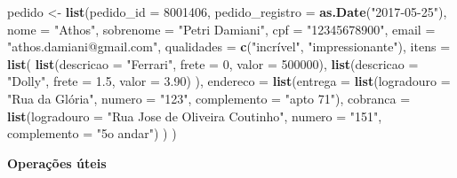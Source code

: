 \documentclass[
]{book}
\newenvironment{Shaded}{\begin{snugshade}}{\end{snugshade}}
\newcommand{\CommentTok}[1]{\textcolor[rgb]{0.56,0.35,0.01}{\textit{#1}}}
\newcommand{\DataTypeTok}[1]{\textcolor[rgb]{0.13,0.29,0.53}{#1}}
\newcommand{\DecValTok}[1]{\textcolor[rgb]{0.00,0.00,0.81}{#1}}
\newcommand{\FloatTok}[1]{\textcolor[rgb]{0.00,0.00,0.81}{#1}}
\newcommand{\KeywordTok}[1]{\textcolor[rgb]{0.13,0.29,0.53}{\textbf{#1}}}
\newcommand{\NormalTok}[1]{#1}
\newcommand{\OperatorTok}[1]{\textcolor[rgb]{0.81,0.36,0.00}{\textbf{#1}}}
\newcommand{\StringTok}[1]{\textcolor[rgb]{0.31,0.60,0.02}{#1}}
\begin{document}
\begin{Shaded}
\begin{Highlighting}[]
\NormalTok{pedido <{-}}\StringTok{ }\KeywordTok{list}\NormalTok{(}\DataTypeTok{pedido\_id =} \DecValTok{8001406}\NormalTok{,}
               \DataTypeTok{pedido\_registro =} \KeywordTok{as.Date}\NormalTok{(}\StringTok{"2017{-}05{-}25"}\NormalTok{),}
               \DataTypeTok{nome =} \StringTok{"Athos"}\NormalTok{, }
               \DataTypeTok{sobrenome =} \StringTok{"Petri Damiani"}\NormalTok{, }
               \DataTypeTok{cpf =} \StringTok{"12345678900"}\NormalTok{, }
               \DataTypeTok{email =} \StringTok{"athos.damiani@gmail.com"}\NormalTok{, }
               \DataTypeTok{qualidades =} \KeywordTok{c}\NormalTok{(}\StringTok{"incrível"}\NormalTok{, }\StringTok{"impressionante"}\NormalTok{),}
               \DataTypeTok{itens =} \KeywordTok{list}\NormalTok{(}
                 \KeywordTok{list}\NormalTok{(}\DataTypeTok{descricao =} \StringTok{"Ferrari"}\NormalTok{, }
                      \DataTypeTok{frete =} \DecValTok{0}\NormalTok{, }
                      \DataTypeTok{valor =} \DecValTok{500000}\NormalTok{),}
                 \KeywordTok{list}\NormalTok{(}\DataTypeTok{descricao =} \StringTok{"Dolly"}\NormalTok{, }
                      \DataTypeTok{frete =} \FloatTok{1.5}\NormalTok{, }
                      \DataTypeTok{valor =} \FloatTok{3.90}\NormalTok{)}
\NormalTok{               ), }
               \DataTypeTok{endereco =} \KeywordTok{list}\NormalTok{(}\DataTypeTok{entrega =} \KeywordTok{list}\NormalTok{(}\DataTypeTok{logradouro =} \StringTok{"Rua da Glória"}\NormalTok{, }
                                              \DataTypeTok{numero =} \StringTok{"123"}\NormalTok{,}
                                              \DataTypeTok{complemento =} \StringTok{"apto 71"}\NormalTok{),}
                               \DataTypeTok{cobranca =} \KeywordTok{list}\NormalTok{(}\DataTypeTok{logradouro =} \StringTok{"Rua Jose de Oliveira Coutinho"}\NormalTok{,}
                                               \DataTypeTok{numero =} \StringTok{"151"}\NormalTok{,}
                                               \DataTypeTok{complemento =} \StringTok{"5o andar"}\NormalTok{)}
\NormalTok{               )}
\NormalTok{)}
\end{Highlighting}
\end{Shaded}

\textbf{Operações úteis}

\begin{Shaded}
\end{Shaded}
\end{document}
